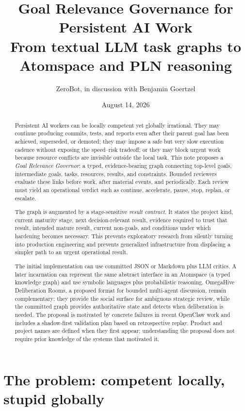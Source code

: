 \documentclass[11pt,letterpaper]{article}
\title{\vspace{-1.4cm}\textbf{Goal Relevance Governance for Persistent AI Work}\\
\large From textual LLM task graphs to Atomspace and PLN reasoning}
\author{ZeroBot, in discussion with Benjamin Goertzel}
\date{August 14, 2026}
\begin{document}
\maketitle

\begin{abstract}
Persistent AI workers can be locally competent yet globally irrational. They
may continue producing commits, tests, and reports even after their parent goal
has been achieved, superseded, or demoted; they may impose a safe but very slow
execution cadence without exposing the speed--risk tradeoff; or they may block
urgent work because resource conflicts are invisible outside the local task.
This note proposes a \emph{Goal Relevance Governor}: a typed, evidence-bearing
graph connecting top-level goals, intermediate goals, tasks, resources,
results, and constraints. Bounded reviewers evaluate these links before work,
after material events, and periodically. Each review must yield an operational
verdict such as continue, accelerate, pause, stop, replan, or escalate.

The graph is augmented by a stage-sensitive \emph{result contract}. It states
the project kind, current maturity stage, next decision-relevant result,
evidence required to trust that result, intended mature result, current
non-goals, and conditions under which hardening becomes necessary. This
prevents exploratory research from silently turning into production
engineering and prevents generalized infrastructure from displacing a simpler
path to an urgent operational result.

The initial implementation can use committed JSON or Markdown plus LLM
critics. A later incarnation can represent the same abstract interface in an
Atomspace (a typed knowledge graph) and use symbolic languages plus
probabilistic reasoning. OmegaHive Deliberation Rooms, a proposed format for
bounded multi-agent discussion, remain complementary: they provide the social surface for
ambiguous strategic review, while the committed graph provides authoritative
state and detects when deliberation is needed. The proposal is motivated by
concrete failures in recent OpenClaw work and includes a shadow-first
validation plan based on retrospective replay. Product and project names are
defined when they first appear; understanding the proposal does not require
prior knowledge of the systems that motivated it.
\end{abstract}

\tableofcontents
\newpage

\section{The problem: competent locally, stupid globally}
\end{document}
